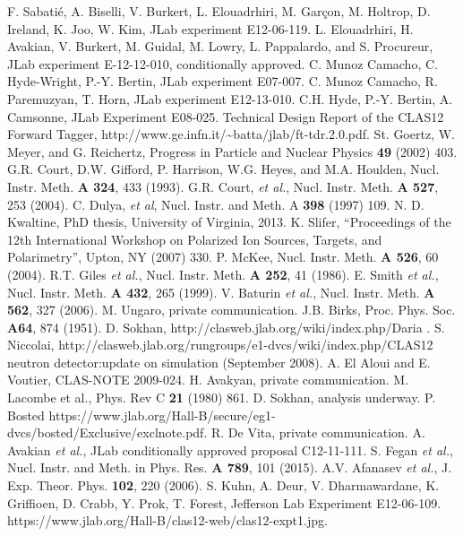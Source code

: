\documentclass[a4paper,12pt]{report}
\begin{document}
\begin{thebibliography}{99}
 F. Sabati\'e, A. Biselli, V. Burkert, L. Elouadrhiri, M. Gar\c{c}on, M. Holtrop, D. Ireland, K. Joo, W. Kim, JLab experiment E12-06-119.
  L. Elouadrhiri, H. Avakian, V. Burkert, M. Guidal, M. Lowry, L. Pappalardo, and S. Procureur, JLab experiment E-12-12-010, conditionally approved.
 C. Munoz Camacho, C. Hyde-Wright, P.-Y. Bertin, JLab experiment E07-007.
 C. Munoz Camacho, R. Paremuzyan, T. Horn, JLab experiment E12-13-010. 
 C.H. Hyde, P.-Y. Bertin, A. Camsonne, JLab Experiment E08-025.
 Technical Design Report of the CLAS12 Forward Tagger, {\rm http://www.ge.infn.it/\textasciitilde batta/jlab/ft-tdr.2.0.pdf}.
 St. Goertz, W. Meyer, and G. Reichertz, Progress in Particle and Nuclear Physics {\bf 49} (2002) 403.
 G.R. Court, D.W. Gifford, P. Harrison, W.G. Heyes, and M.A. Houlden, Nucl. Instr. Meth. {\bf A 324}, 433 (1993). 
 G.R. Court, {\it et al.}, Nucl. Instr. Meth. {\bf A 527}, 253 (2004).
  C. Dulya, {\it et al}, Nucl. Instr. and Meth. A \textbf{398} (1997) 109.
 N. D. Kwaltine, PhD thesis, University of Virginia, 2013.
 K. Slifer, ``Proceedings of the 12th International Workshop on Polarized Ion Sources, Targets, and Polarimetry'', Upton, NY (2007) 330.
 P. McKee, Nucl. Instr. Meth. {\bf A 526}, 60 (2004).
 R.T. Giles {\it et al.}, Nucl. Instr. Meth. {\bf A 252}, 41 (1986).
 E. Smith {\it et al.}, Nucl. Instr. Meth. {\bf A 432}, 265 (1999).
 V. Baturin {\it et al.}, Nucl. Instr. Meth. {\bf A 562}, 327 (2006).
 M. Ungaro, private communication.
 J.B. Birks, Proc. Phys. Soc. {\bf A64}, 874 (1951).
 D. Sokhan, http://clasweb.jlab.org/wiki/index.php/Daria .
 S. Niccolai, {\rm http://clasweb.jlab.org/rungroups/e1-dvcs/wiki/index.php/CLAS12 neutron detector:update on simulation (September 2008)}.
 A. El Aloui and E. Voutier, CLAS-NOTE 2009-024.
 H. Avakyan, private communication.
 M. Lacombe et al., Phys. Rev C {\bf 21} (1980) 861.
 D. Sokhan, analysis underway. 
 P. Bosted {\rm https://www.jlab.org/Hall-B/secure/eg1-dvcs/bosted/Exclusive/exclnote.pdf}.
  R. De Vita, private communication.
 A. Avakian {\it et al.}, JLab conditionally approved proposal C12-11-111. 
 S. Fegan {\it et al.}, Nucl. Instr. and Meth. in Phys. Res. {\bf A 789}, 101 (2015).   
 A.V. Afanasev {\it et al.}, J. Exp. Theor. Phys. {\bf 102}, 220 (2006).
 S. Kuhn, A. Deur, V. Dharmawardane, K. Griffioen, D. Crabb, Y. Prok, T. Forest, Jefferson Lab Experiment E12-06-109.
 {\rm https://www.jlab.org/Hall-B/clas12-web/clas12-expt1.jpg}.



\end{thebibliography}
\end{document}
